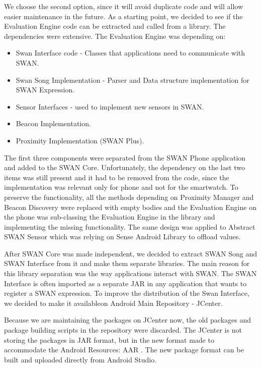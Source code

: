 We choose the second option, since it will avoid duplicate code and will allow easier maintenance in the future. As a starting point, we decided to see if the Evaluation Engine
code can be extracted and called from a library. The dependencies were extensive. The Evaluation Engine was depending on:
\begin{itemize}
 \item Swan Interface code - Classes that applications need to communicate with SWAN.
 \item Swan Song Implementation - Parser and Data structure implementation for SWAN Expression.
 \item Sensor Interfaces - used to implement new sensors in SWAN.
 \item Beacon Implementation.
 \item Proximity Implementation (SWAN Plus).
\end{itemize}

The first three components were separated from the SWAN Phone application and added to the SWAN Core. Unfortunately, the dependency on the last two items
was still present and it had to be removed from the code, since the implementation was relevant only for phone and not for the smartwatch.
To preserve the functionality, all the methods depending on Proximity Manager and Beacon Discovery were replaced with empty bodies and the Evaluation Engine on
the phone was sub-classing the Evaluation Engine in the library and implementing the missing functionality.
The same design was applied to Abstract SWAN Sensor which was relying on Sense Android Library to offload values\cite{swan_layer}.

After SWAN Core was made independent, we decided to extract SWAN Song and SWAN Interface from it and make them separate libraries.
The main reason for this library separation was the way applications interact with SWAN. The SWAN Interface is often imported as a separate JAR in any application that wants to register a 
SWAN expression. To improve the distribution of the Swan Interface, we decided to make it available\footnotemark  on Android Main Repository - JCenter\cite{jcenter}. 

Because we are maintaining the packages on JCenter now, the old packages and package building scripts  in the repository were discarded.
The JCenter  is not storing the packages in JAR format, but in the new format made to accommodate the Android Resources: AAR \cite{aar_format}. 
The new package format can be built and uploaded directly from Android Studio. 

